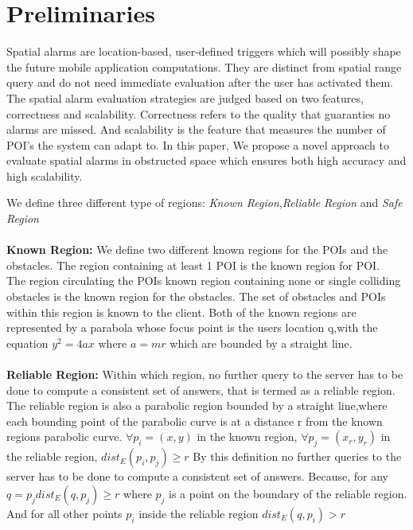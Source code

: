 \documentclass{sig-alternate}
\begin{document}
\section{Preliminaries}
Spatial alarms are location-based, user-defined triggers which will possibly shape the future mobile application computations. They are distinct from spatial range query and do not need immediate evaluation after the user has activated them. The spatial alarm evaluation strategies are judged based on two features, correctness and scalability. Correctness refers to the quality that guaranties no alarms are missed. And scalability is the feature that measures the number of POI's the system can adapt to. 
In this paper, We propose a novel approach to evaluate spatial alarms in obstructed space which ensures both high accuracy and high scalability.

We define three different type of regions: \textit{Known Region},\textit{Reliable Region} and \textit{Safe Region}\\ \\

\textbf{Known Region:} We define two different known regions for the POIs and the obstacles. The region containing at least 1 POI is the known region for POI.\\
The region circulating the POIs known region containing none or single colliding obstacles is the known region for the obstacles. The set of obstacles and POIs within this region is known to the client. 
Both of the known regions are represented by a parabola whose focus point is the users location q,with the equation $y^2=4ax$ where $a=mr$ which are bounded by a straight line. \\ \\


\textbf{Reliable Region:} Within which region, no further query to the server has to be done to compute a consistent set of answers, that is termed as a reliable region. The reliable region is also a parabolic region bounded by a straight line,where each bounding point of the parabolic curve is at a distance r from the known regions parabolic curve. $ \forall p_i=(x,y) $ in the known region, $ \forall p_j=(x_r,y_r) $ in the reliable region, $ dist_E(p_i,p_j)\geq r $ By this definition no further queries to the server has to be done to compute a consistent set of answers. Because, for any $q =p_j dist_E(q,p_j) \geq r$ where $p_j$ is a point on the boundary of the reliable region. And for all other points $ p_i $ inside the reliable region $  dist_E(q,p_i)>r$ \\ \\
\end{document}
